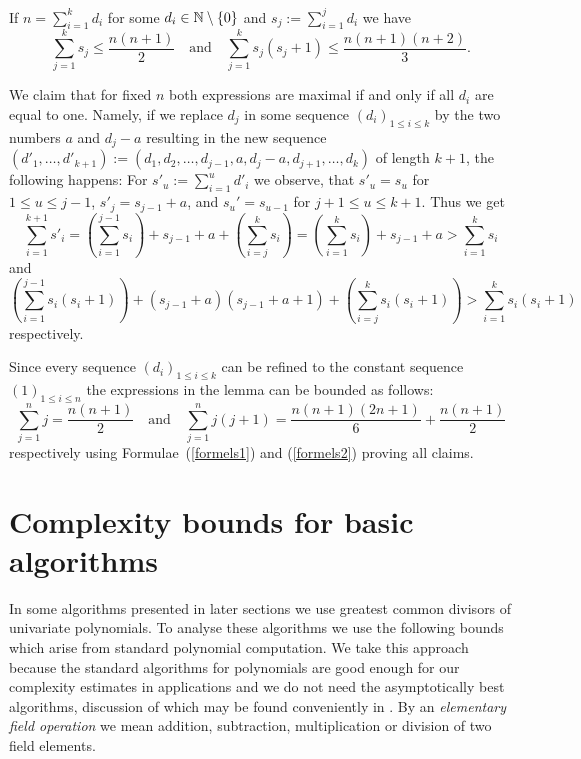 \begin{Lemm}
\label{estimates}
If $n = \sum_{i=1}^k d_i$ for some $d_i \in \mathbb{N} \setminus\{0\}$ and
$s_j := \sum_{i=1}^j d_i$ we have
\[ \sum_{j=1}^k s_j \le \frac{n(n+1)}{2} \quad \mbox{and} \quad
   \sum_{j=1}^k s_j(s_j+1) 
   \le \frac{n(n+1)(n+2)}{3}. \]
\end{Lemm}
\proofbeg
We claim that for fixed $n$ both expressions are maximal if and only if
all $d_i$ are equal to one. Namely, if we replace $d_j$ in some sequence
$(d_i)_{1 \le i \le k}$ by the two numbers $a$ and $d_j-a$ resulting
in the new sequence $(d'_1, \ldots, d'_{k+1}) := 
(d_1, d_2, \ldots, d_{j-1}, a, d_j-a, d_{j+1}, \ldots, d_k)$ 
of length $k+1$, the following happens: For $s'_u := \sum_{i=1}^u d'_i$
we observe, that $s'_u=s_u$ for $1\le u\le j-1$, $s'_j=s_{j-1}+a$, and 
$s_u'=s_{u-1}$ for $j+1\leq u\leq k+1$. Thus we get
\[ \sum_{i=1}^{k+1} s'_i = \left(\sum_{i=1}^{j-1} s_i \right)
   + s_{j-1}+a + \left(\sum_{i=j}^k s_i\right)
   = \left(\sum_{i=1}^k s_i\right) + s_{j-1} + a
   > \sum_{i=1}^k s_i \]
and
\[ \left( \sum_{i=1}^{j-1} s_i(s_i+1) \right)
   + (s_{j-1}+a)(s_{j-1}+a+1)
   + \left( \sum_{i=j}^k s_i(s_i + 1) \right)
   > \sum_{i=1}^k s_i(s_i + 1) \]
respectively. 

Since every sequence $(d_i)_{1 \le i \le k}$ can
be refined to the constant sequence $(1)_{1 \le i \le n}$ the
expressions in the lemma can be bounded as follows:
\[ \sum_{j=1}^n j = \frac{n(n+1)}{2} \quad\mbox{and}\quad
   \sum_{j=1}^n j(j+1)
   = \frac{n(n+1)(2n+1)}{6} + \frac{n(n+1)}{2} \]
respectively using Formulae~(\ref{formels1}) and (\ref{formels2}) 
proving all claims.
\proofend

\section{Complexity bounds for basic algorithms}
\label{complexity}

In some algorithms presented in later sections we use greatest common divisors
of univariate polynomials. To analyse these algorithms we use the 
following bounds which arise from standard polynomial computation. 
We take this approach because the standard algorithms for polynomials
are good enough for our complexity estimates in applications and we do not 
need the asymptotically best algorithms, discussion of which may be found 
conveniently in \cite{vzG}. By an \emph{elementary field operation} 
we mean addition, subtraction, multiplication or division of two field 
elements.

